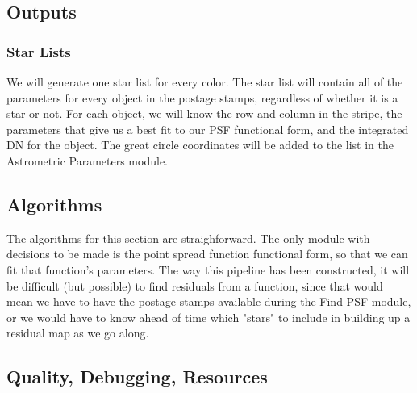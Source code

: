 \subsection{Outputs}

\subsubsection{Star Lists}

We will generate one star list for every color.
The star list will contain all of the parameters for every object in the
postage stamps, regardless of whether it is a star or not.  For each object,
we will know the row and column in the stripe, the parameters that give
us a best fit to our PSF functional form, and the integrated DN for the
object.  The great circle coordinates will be added to the list in the
Astrometric Parameters module.

\subsection{Algorithms}

The algorithms for this section are straighforward.  The only module
with decisions to be made is the point spread function functional form,
so that we can fit that function's parameters.  The way this pipeline
has been constructed, it will be difficult (but possible) to find residuals 
from a function, since that would mean we have to have the postage stamps
available during the Find PSF module, or we would have to know ahead
of time which "stars" to include in building up a residual map as we
go along.

\subsection{Quality, Debugging, Resources}
